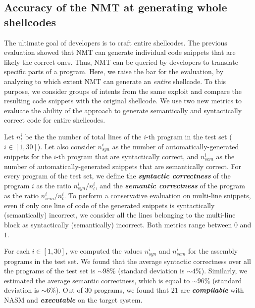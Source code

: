 \subsection{Accuracy of the NMT at generating whole shellcodes}
\label{subsec:RQ3}
The ultimate goal of developers is to craft entire shellcodes. The previous evaluation showed that NMT can generate individual code snippets that are likely the correct ones. Thus, NMT can be queried by developers to translate specific parts of a program. Here, we raise the bar for the evaluation, by analyzing to which extent NMT can generate an \emph{entire} shellcode. To this purpose, we consider groups of intents from the same exploit and compare the resulting code snippets with the original shellcode. We use two new metrics to evaluate the ability of the approach to generate semantically and syntactically correct code for entire shellcodes.

Let $n_t^i$ be the the number of total lines of the $i$-th program in the test set ($i \in [1,30]$). Let also consider $n_{syn}^i$ as the number of automatically-generated snippets for the $i$-th program that are syntactically correct, and $n_{sem}^i$ as the number of automatically-generated snippets that are semantically correct. For every program of the test set, we define the \textit{\textbf{syntactic correctness}} of the program $i$ as the ratio $n_{syn}^i / n_t^i$, and the \textit{\textbf{semantic correctness}} of the program as the ratio $n_{sem}^i / n_t^i$. 
To perform a conservative evaluation on multi-line snippets, even if only one line of code of the generated snippets is syntactically (semantically) incorrect, we consider all the lines belonging to the multi-line block as syntactically (semantically) incorrect. 
Both metrics range between $0$ and $1$.


For each $i \in [1,30]$, we computed the values $n_{syn}^i$ and $n_{sem}^i$ for the assembly programs in the test set. 
We found that the average syntactic correctness over all the programs of the test set is $\sim 98\%$ (standard deviation is $\sim 4\%$). Similarly, we estimated the average semantic correctness, which is equal to $\sim96\%$ (standard deviation is $\sim 6\%$). Out of $30$ programs, we found that $21$ are \textbf{\textit{compilable}} with NASM and \textbf{\textit{executable}} on the target system.








